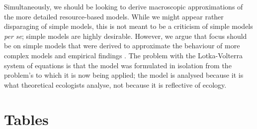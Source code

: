 \documentclass[a4paper,11pt]{article}
\begin{document}
Simultaneously, we should be looking to derive macroscopic
approximations of the more detailed resource-based models.  While we
might appear rather disparaging of simple models, this is not meant
to be a criticism of simple models \textit{per se}; simple models are
highly desirable.  However, we argue that focus should be on simple models
that were derived to approximate the behaviour of more complex models and
empirical findings \citep[e.g.][]{Champagnat-2006}.
The problem with the Lotka-Volterra system of equations is that the
model was formulated in isolation from the problem's to which it is
now being applied; the model is analysed because it is what
theoretical ecologists analyse, not because it is reflective of
ecology.


\clearpage

\section{Tables}
\end{document}

